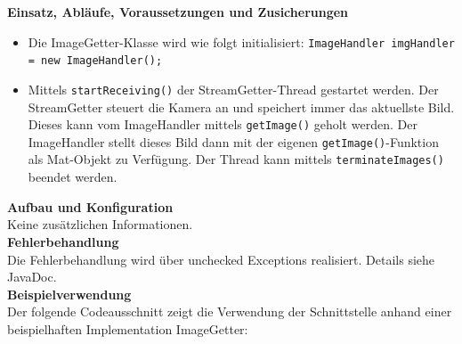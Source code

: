 \noindent
\textbf{Einsatz, Abläufe, Voraussetzungen und Zusicherungen}
\begin{itemize}
	\item{Die ImageGetter-Klasse wird wie folgt initialisiert: 
        \verb?ImageHandler imgHandler = new ImageHandler();? }
	\item{Mittels \verb?startReceiving()? der StreamGetter-Thread gestartet 
        werden. Der StreamGetter steuert die Kamera an und speichert immer das 
        aktuellste Bild. Dieses kann vom ImageHandler mittels 
        \verb?getImage()? geholt werden. Der ImageHandler stellt dieses Bild 
        dann mit der eigenen \verb?getImage()?-Funktion als Mat-Objekt zu 
        Verfügung. Der Thread kann mittels \verb?terminateImages()? beendet 
        werden.}
\end{itemize}

\noindent
\textbf{Aufbau und Konfiguration}  \\
Keine zusätzlichen Informationen. \\

\noindent
\textbf{Fehlerbehandlung} \\
Die Fehlerbehandlung wird über unchecked Exceptions realisiert. Details siehe JavaDoc. \\

\clearpage
\noindent
\textbf{Beispielverwendung} \\
Der folgende Codeausschnitt zeigt die Verwendung der Schnittstelle anhand einer beispielhaften Implementation ImageGetter: \\

